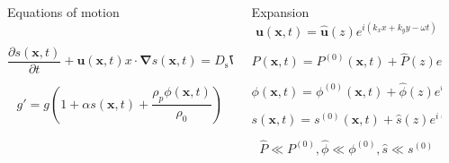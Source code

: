 \documentclass[final]{beamer} %
\begin{document}
\begin{frame}[t]
\begin{columns}[t]
\begin{column}{0.6\paperwidth}
\begin{columns}[t]
\begin{column}{0.43\paperwidth}
\begin{block}{Equations of motion}
\begin{columns}[t]
\begin{column}{0.3\paperwidth}
                    $$ \frac{\partial s(\mathbf{x}, t)}{\partial t} +
                    \mathbf{u}(\mathbf{x}, t)x \cdot \mathbf{\nabla} s(\mathbf{x}, t) =
                    D_{\text{s}} \nabla^{2} s(\mathbf{x}, t) $$

                    $$ g' = g \left(1 + \alpha s(\mathbf{x}, t) 
                    + \frac{\rho_{p} \phi(\mathbf{x}, t)}{\rho_{0}} \right) $$

              \end{column}

            \end{columns}
          \end{block}
        \end{column}
        \begin{column}{0.17\paperwidth}
          \begin{block}{Expansion}
            $$ \mathbf{u}(\mathbf{x}, t) = \mathbf{\hat{u}}(z) e^{i(k_{x} x + k_{y} y - \omega t)}$$

            $$ P(\mathbf{x}, t) = P^{(0)}(\mathbf{x}, t) +
            \hat{P}(z) e^{i(k x - \omega t)}$$

            $$ \phi(\mathbf{x}, t) = \phi^{(0)}(\mathbf{x}, t) +
            \hat{\phi}(z) e^{i(k x - \omega t)}$$
      
            $$ s(\mathbf{x}, t) = s^{(0)}(\mathbf{x}, t) +
            \hat{s}(z) e^{i(k x - \omega t)}$$

            $$\hat{P} \ll P^{(0)}, \hat{\phi} \ll \phi^{(0)}, \hat{s} \ll s^{(0)}$$
          \end{block}

        \end{column}
      \end{columns}
      
    \end{column}

    \begin{column}{0.3\paperwidth}

      \vspace{-3cm}
      
      \begin{columns}[t]
        \begin{column}{0.12\paperwidth}

          \vspace{-2.2cm}


\end{column}
\end{columns}
\end{column}
\end{columns}
\end{frame}
\end{document}
